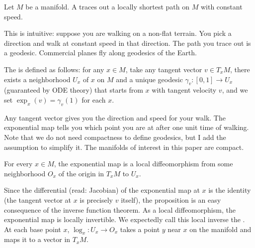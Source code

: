 \documentclass[12pt]{article}
\begin{document}
\begin{defn}
Let $ M$ be a manifold. A  traces out a locally shortest path on $ M$ with constant speed.
\end{defn}
This is intuitive: suppose you are walking on a non-flat terrain. You pick a direction and walk at constant speed in that direction. The path you trace out is a geodesic. Commercial planes fly along geodesics of the Earth.
\begin{defn}
	The  is defined as follows: for any $ x \in M$, take any tangent vector $ v \in T_xM$, there exists a neighborhood $ U_x$ of $ x$ on $ M$ and a unique geodesic $ \gamma_v: [0,1] \to U_x$ (guaranteed by ODE theory) that starts from $ x$ with tangent velocity $ v$, and we set $ \exp_x(v) = \gamma_v(1)$ for each $ x$.
\end{defn}
Any tangent vector gives you the direction and speed for your walk. The exponential map tells you which point you are at after one unit time of walking. Note that we do not need compactness to define geodesics, but I add the assumption to simplify it. The manifolds of interest in this paper are compact.
\begin{prop}
For every $ x \in M$, the exponential map is a local diffeomorphism from some neighborhood $ O_x$ of the origin in $ T_xM$ to $ U_x$.
\end{prop}
Since the differential (read: Jacobian) of the exponential map at $ x$ is the identity (the tangent vector at $ x$ is precisely $ v$ itself), the proposition is an easy consequence of the inverse function theorem. As a local diffeomorphism, the exponential map is locally invertible. We expectedly call this local inverse the . At each base point $ x$, $ \log_x : U_x \to O_x$ takes a point $ y$ near  $ x$ on the manifold and maps it to a vector in  $ T_xM$.
\end{document}
